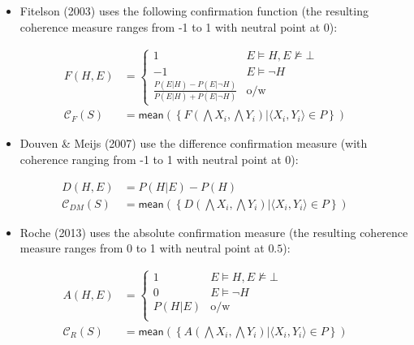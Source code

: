 \documentclass[
  10pt,
]{scrartcl}
\providecommand{\tightlist}{%
  \setlength{\itemsep}{0pt}\setlength{\parskip}{0pt}}
\begin{document}
\begin{itemize}
\tightlist
\item
  Fitelson (2003) uses the following confirmation function (the resulting coherence measure ranges from -1 to 1 with neutral point at 0):
\end{itemize}

\begin{align}
    F(H,E) & = \begin{cases}
    1 & E\models H, E\not \models \bot \\
    -1 & E \models \neg H\\
    \frac{P(E|H)-P(E|\neg H)}{P(E|H)+P(E|\neg H)} & \mbox{o/w}
    \end{cases} \nonumber \\
\tag{Fitelson}  
    \mathcal{C}_{F}(S) & =
\mathsf{mean}\left(\left\{F(\bigwedge X_i, \bigwedge Y_i) | \langle X_i, Y_i\rangle \in P\right\} \right)
\end{align}

\begin{itemize}
\tightlist
\item
  Douven \& Meijs (2007) use the difference confirmation measure (with coherence ranging from -1 to 1 with neutral point at 0):
\end{itemize}

\begin{align}
    D(H,E) &= P(H|E) - P(H) \nonumber \\
\tag{DM}  
    \mathcal{C}_{DM}(S) & =
\mathsf{mean}\left(\left\{D(\bigwedge X_i, \bigwedge Y_i) | \langle X_i, Y_i\rangle \in P\right\} \right)
\end{align}

\begin{itemize}
\tightlist
\item
  Roche (2013) uses the absolute confirmation measure
  (the resulting coherence measure ranges from 0 to 1 with neutral point at \(0.5\)):
\end{itemize}

\begin{align} \nonumber 
    A(H,E)  & = \begin{cases}
    1 & E\models H, E\not \models \bot \\
    0 & E \models \neg H\\
    P(H|E) & \mbox{o/w} \\
    \end{cases} \\
\tag{Roche}  
    \mathcal{C}_{R}(S) & =
\mathsf{mean}\left(\left\{A(\bigwedge X_i, \bigwedge Y_i) | \langle X_i, Y_i\rangle \in P\right\} \right) 
\end{align}
\end{document}
